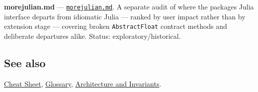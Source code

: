 \textbf{morejulian.md} — \href{https://github.com/JeffreySarnoff/SmallFloats.jl/blob/main/docs/other/morejulian.md}{\texttt{morejulian.md}}. A separate audit of where the package{\textquotesingle}s Julia interface departs from idiomatic Julia — ranked by user impact rather than by extension stage — covering broken \texttt{AbstractFloat} contract methods and deliberate departures alike. Status: exploratory/historical.



\subsection{See also}



\label{292862844209942199-dup27}{}


\href{help\_\allowbreak{}cheat\_\allowbreak{}sheet.md}{Cheat Sheet}, \href{help\_\allowbreak{}glossary.md}{Glossary}, \href{internals\_\allowbreak{}architecture.md}{Architecture and Invariants}.




